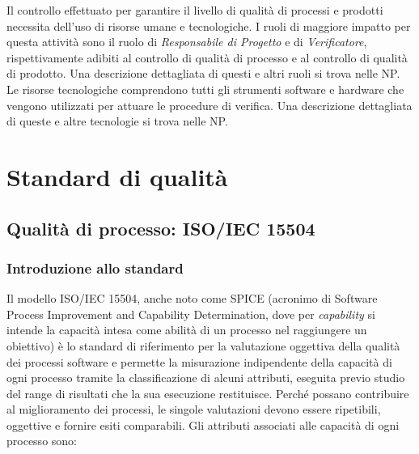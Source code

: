 \documentclass[openany,12pt,a4paper]{report}
\begin{document}
Il controllo effettuato per garantire il livello di qualità di processi e prodotti necessita dell'uso di risorse umane e tecnologiche. I ruoli di maggiore impatto per questa attività sono il ruolo di \textit{Responsabile di Progetto} e di \textit{Verificatore}, rispettivamente adibiti al controllo di qualità di processo e al controllo di qualità di prodotto. Una descrizione dettagliata di questi e altri ruoli si trova nelle NP.
Le risorse tecnologiche comprendono tutti gli strumenti software e hardware che vengono utilizzati per attuare le procedure di verifica. Una descrizione dettagliata di queste e altre tecnologie si trova nelle NP.

\appendix


\chapter{Standard di qualità}


\section{Qualità di processo: ISO/IEC 15504}

\subsection{Introduzione allo standard}

Il modello ISO/IEC 15504, anche noto come SPICE (acronimo di Software Process Improvement and Capability Determination, dove per \textit{capability} si intende la capacità intesa come abilità di un processo nel raggiungere un obiettivo) è lo standard di riferimento per la valutazione oggettiva della qualità dei processi software e permette la misurazione indipendente della capacità di ogni processo tramite la classificazione di alcuni attributi, eseguita previo studio del range di risultati che la sua esecuzione restituisce. Perché possano contribuire al miglioramento dei processi, le singole valutazioni devono essere ripetibili, oggettive e fornire esiti comparabili. Gli attributi associati alle capacità di ogni processo sono:
\end{document}
